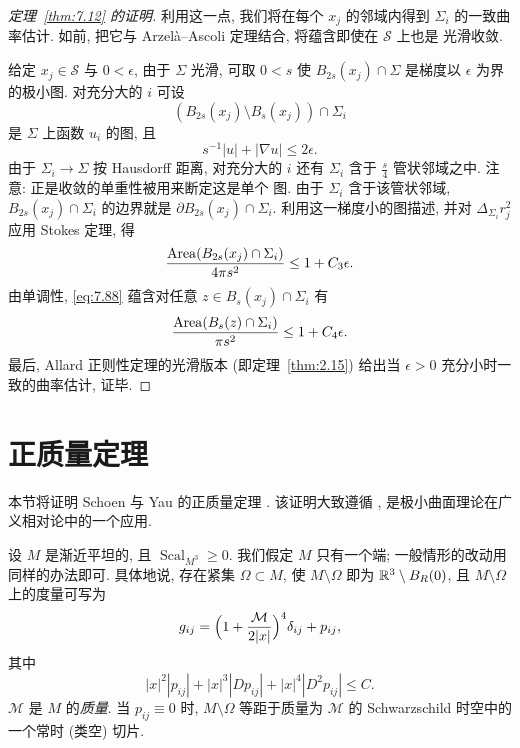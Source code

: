 \begin{proof}[定理~\ref{thm:7.12} 的证明]
利用这一点, 我们将在每个 $x_j$ 的邻域内得到 $\Sigma_i$ 的一致曲率估计.
如前, 把它与 Arzelà--Ascoli 定理结合, 将蕴含即使在 $\mathcal{S}$ 上也是
光滑收敛.

给定 $x_j\in\mathcal{S}$ 与 $0<\epsilon$, 由于 $\Sigma$ 光滑, 可取 $0<s$
使 $B_{2s}(x_j)\cap\Sigma$ 是梯度以 $\epsilon$ 为界的极小图. 对充分大的
$i$ 可设
\[
(B_{2s}(x_j)\setminus B_s(x_j))\cap\Sigma_i
\]
是 $\Sigma$ 上函数 $u_i$ 的图, 且
\[
s^{-1}|u|+|\nabla u|\leq2\epsilon.
\]
由于 $\Sigma_i\to\Sigma$ 按 Hausdorff 距离, 对充分大的 $i$ 还有 $\Sigma_i$
含于 $\frac s4$ 管状邻域之中. 注意: 正是收敛的单重性被用来断定这是单个
图. 由于 $\Sigma_i$ 含于该管状邻域, $B_{2s}(x_j)\cap\Sigma_i$ 的边界就是
$\partial B_{2s}(x_j)\cap\Sigma_i$. 利用这一梯度小的图描述, 并对
$\Delta_{\Sigma_i}r_j^2$ 应用 Stokes 定理, 得
\begin{equation}
\frac{\operatorname{Area}(B_{2s}(x_j)\cap\Sigma_i)}{4\pi s^2}\leq1+C_3\epsilon.
\label{eq:7.88}
\end{equation}
由单调性, \eqref{eq:7.88} 蕴含对任意 $z\in B_s(x_j)\cap\Sigma_i$ 有
\begin{equation}
\frac{\operatorname{Area}(B_s(z)\cap\Sigma_i)}{\pi s^2}\leq1+C_4\epsilon.
\label{eq:7.89}
\end{equation}
最后, Allard 正则性定理的光滑版本 (即定理~\ref{thm:2.15}) 给出当 $\epsilon>0$
充分小时一致的曲率估计, 证毕.
\end{proof}

\section{正质量定理}
\label{sec:7.6}

本节将证明 Schoen 与 Yau 的正质量定理 \cite{ScYa1}. 该证明大致遵循
\cite{ScYa1}, 是极小曲面理论在广义相对论中的一个应用.

设 $M$ 是渐近平坦的, 且 $\operatorname{Scal}_{M^3}\geq0$. 我们假定 $M$
只有一个端; 一般情形的改动用同样的办法即可. 具体地说, 存在紧集
$\Omega\subset M$, 使 $M\setminus\Omega$ 即为 $\mathbb{R}^3\setminus B_R(0)$,
且 $M\setminus\Omega$ 上的度量可写为
\begin{equation}
g_{ij}=\Bigl(1+\frac{\mathcal{M}}{2|x|}\Bigr)^4\delta_{ij}+p_{ij},
\label{eq:7.90}
\end{equation}
其中
\begin{equation}
|x|^2|p_{ij}|+|x|^3|Dp_{ij}|+|x|^4|D^2p_{ij}|\leq C.
\label{eq:7.91}
\end{equation}
$\mathcal{M}$ 是 $M$ 的\emph{质量}. 当 $p_{ij}\equiv0$ 时,
$M\setminus\Omega$ 等距于质量为 $\mathcal{M}$ 的 Schwarzschild 时空中的
一个常时 (类空) 切片.

